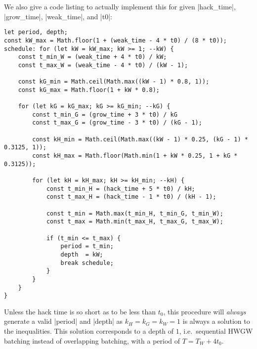 \documentclass[veryplain]{notes}
\begin{document}
We also give a code listing to actually implement this for given |hack_time|, |grow_time|, |weak_time|, and |t0|:
\begin{lstlisting}
let period, depth;
const kW_max = Math.floor(1 + (weak_time - 4 * t0) / (8 * t0));
schedule: for (let kW = kW_max; kW >= 1; --kW) {
    const t_min_W = (weak_time + 4 * t0) / kW;
    const t_max_W = (weak_time - 4 * t0) / (kW - 1);

    const kG_min = Math.ceil(Math.max((kW - 1) * 0.8, 1));
    const kG_max = Math.floor(1 + kW * 0.8);

    for (let kG = kG_max; kG >= kG_min; --kG) {
        const t_min_G = (grow_time + 3 * t0) / kG
        const t_max_G = (grow_time - 3 * t0) / (kG - 1);

        const kH_min = Math.ceil(Math.max((kW - 1) * 0.25, (kG - 1) * 0.3125, 1));
        const kH_max = Math.floor(Math.min(1 + kW * 0.25, 1 + kG * 0.3125));

        for (let kH = kH_max; kH >= kH_min; --kH) {
            const t_min_H = (hack_time + 5 * t0) / kH;
            const t_max_H = (hack_time - 1 * t0) / (kH - 1);

            const t_min = Math.max(t_min_H, t_min_G, t_min_W);
            const t_max = Math.min(t_max_H, t_max_G, t_max_W);

            if (t_min <= t_max) {
                period = t_min;
                depth  = kW;
                break schedule;
            }
        }
    }
}
\end{lstlisting}
Unless the hack time is so short as to be less than $t_0$, this procedure will \emph{always} generate a valid |period| and |depth| as $k_H = k_G = k_W = 1$ is always a solution to the inequalities. This solution corresponds to a depth of $1$, i.e.\ sequential HWGW batching instead of overlapping batching, with a period of $T = T_W + 4 t_0$.
\end{document}

